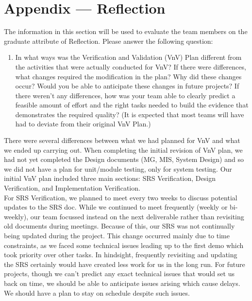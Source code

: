 \documentclass[12pt, titlepage]{article}
\begin{document}
\newpage{}
\section*{Appendix --- Reflection}

The information in this section will be used to evaluate the team members on the
graduate attribute of Reflection.  Please answer the following question:

\begin{enumerate}
  \item In what ways was the Verification and Validation (VnV) Plan different
  from the activities that were actually conducted for VnV?  If there were
  differences, what changes required the modification in the plan?  Why did
  these changes occur?  Would you be able to anticipate these changes in future projects?  If there weren't any differences, how was your team able to clearly predict a feasible amount of effort and the right tasks needed to build the evidence that demonstrates the required quality?  (It is expected that most teams will have had to deviate from their original VnV Plan.)
\end{enumerate}

\indent There were several differences between what we had planned for VnV and what we ended up carrying out. When completing the initial revision of VnV plan, we had not yet completed the Design documents (MG, MIS, System Design) and so we did not have a plan for unit/module testing, only for system testing. Our initial VnV plan included three main sections: SRS Verification, Design Verification, and Implementation Verification.\\

\indent For SRS Verification, we planned to meet every two weeks to discuss potential updates to the SRS doc. While we continued to meet frequently (weekly or bi-weekly), our team focussed instead on the next deliverable rather than revisiting old documents during meetings. Because of this, our SRS was not continually being updated during the project. This change occurred mainly due to time constraints, as we faced some technical issues leading up to the first demo which took priority over other tasks. In hindsight, frequently revisiting and updating the SRS certainly would have created less work for us in the long run. For future projects, though we can't predict any exact technical issues that would set us back on time, we should be able to anticipate issues arising which cause delays. We should have a plan to stay on schedule despite such issues. \\
\end{document}
